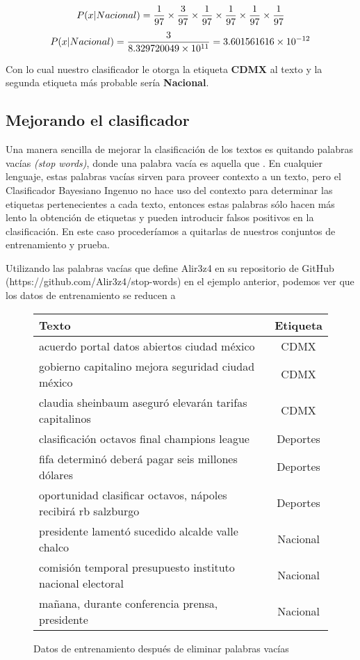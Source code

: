 \[ P(x | Nacional) = {1 \over 97} \times {3 \over 97} \times {1 \over 97} \times {1 \over 97} \times {1 \over 97} \times {1 \over 97} \]
\[ P(x | Nacional) = { 3 \over 8.329720049\times10^{11} } = 3.601561616\times10^{-12} \]


Con lo cual nuestro clasificador le otorga la etiqueta \textbf{CDMX} al texto  y la segunda etiqueta más probable sería \textbf{Nacional}.


\subsection{Mejorando el clasificador}

Una manera sencilla de mejorar la clasificación de los textos es quitando palabras vacías \textit{(stop words)}, donde una palabra vacía es aquella que \parencite[533]{ManningSchutze1999}. En cualquier lenguaje, estas palabras vacías sirven para proveer contexto a un texto, pero el Clasificador Bayesiano Ingenuo no hace uso del contexto para determinar las etiquetas pertenecientes a cada texto, entonces estas palabras sólo hacen más lento la obtención de etiquetas y pueden introducir falsos positivos en la clasificación. En este caso procederíamos a quitarlas de nuestros conjuntos de entrenamiento y prueba.

Utilizando las palabras vacías que define Alir3z4 en su repositorio de GitHub (https://github.com/Alir3z4/stop-words) en el ejemplo anterior, podemos ver que los datos de entrenamiento se reducen a

\begin{figure}[H]
  \begin{center}
    \begin{tabular}{ l | c }
      Texto & Etiqueta \\ \hline
      acuerdo portal datos abiertos ciudad méxico & CDMX  \\ \hline
      gobierno capitalino mejora seguridad ciudad méxico & CDMX  \\ \hline
      claudia sheinbaum aseguró elevarán tarifas capitalinos & CDMX  \\ \hline
      clasificación octavos final champions league & Deportes\\ \hline
      fifa determinó deberá pagar seis millones dólares & Deportes  \\ \hline
      oportunidad clasificar octavos, nápoles recibirá rb salzburgo & Deportes  \\ \hline
      presidente lamentó sucedido alcalde valle chalco & Nacional  \\ \hline
      comisión temporal presupuesto instituto nacional electoral & Nacional  \\ \hline
      mañana, durante conferencia prensa, presidente & Nacional  \\
    \end{tabular}
  \end{center}
  \caption{Datos de entrenamiento después de eliminar palabras vacías}
\end{figure}

